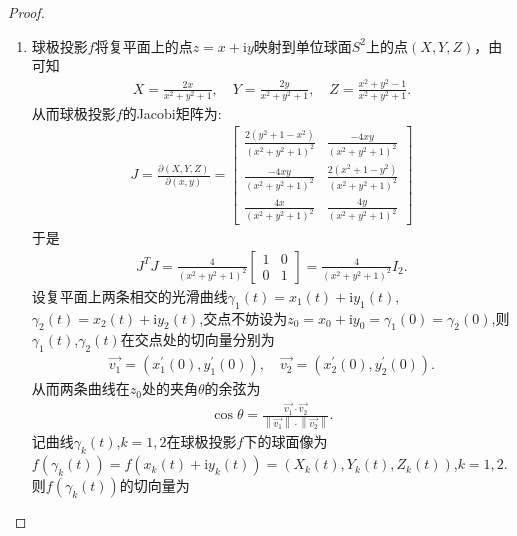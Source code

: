 \documentclass[../../main.tex]{subfiles}%
\begin{document}
\begin{proof}
\begin{enumerate}[(1)]
\item 球极投影$f$将复平面上的点$z = x + \text{i}y$映射到单位球面$S^2$上的点$(X,Y,Z)$，由可知
\begin{align*}
X = \frac{2x}{x^2 + y^2 + 1}, \quad Y = \frac{2y}{x^2 + y^2 + 1}, \quad Z = \frac{x^2 + y^2 - 1}{x^2 + y^2 + 1}.
\end{align*}
从而球极投影$f$的Jacobi矩阵为:
\begin{align*}
J = \frac{\partial(X,Y,Z)}{\partial(x,y)} = \begin{bmatrix}
\frac{2(y^2 + 1 - x^2)}{(x^2 + y^2 + 1)^2} & \frac{-4xy}{(x^2 + y^2 + 1)^2} \\
\frac{-4xy}{(x^2 + y^2 + 1)^2} & \frac{2(x^2 + 1 - y^2)}{(x^2 + y^2 + 1)^2} \\
\frac{4x}{(x^2 + y^2 + 1)^2} & \frac{4y}{(x^2 + y^2 + 1)^2}
\end{bmatrix}
\end{align*}
于是
\begin{align}\label{eq::--2hr89289hjoawjdijwofjo8ewuohj38wjfnv}
J^T J = \frac{4}{(x^2 + y^2 + 1)^2} \begin{bmatrix} 1 & 0 \\ 0 & 1 \end{bmatrix}=\frac{4}{(x^2 + y^2 + 1)^2}I_2.
\end{align}
设复平面上两条相交的光滑曲线$\gamma _1\left( t \right) =x_1\left( t \right) +\mathrm{i}y_1\left( t \right)$,$\gamma _2\left( t \right) =x_2\left( t \right) +\mathrm{i}y_2\left( t \right)$,交点不妨设为$z_0=x_0+\mathrm{i}y_0=\gamma _1\left( 0 \right) =\gamma _2\left( 0 \right)$,则$\gamma _1\left( t \right)$,$\gamma _2\left( t \right)$在交点处的切向量分别为
\begin{align*}
\overrightarrow{v_1}=\left( x_{1}^{\prime}\left( 0 \right) ,y_{1}^{\prime}\left( 0 \right) \right) ,\quad \overrightarrow{v_2}=\left( x_{2}^{\prime}\left( 0 \right) ,y_{2}^{\prime}\left( 0 \right) \right) .
\end{align*}
从而两条曲线在$z_0$处的夹角$\theta$的余弦为
\begin{align*}
\cos \theta =\frac{\overrightarrow{v_1}\cdot \overrightarrow{v_2}}{\left\| \overrightarrow{v_1} \right\| \cdot \left\| \overrightarrow{v_2} \right\|}.
\end{align*}
记曲线$\gamma _k\left( t \right)$,$k=1,2$在球极投影$f$下的球面像为$f\left( \gamma _k\left( t \right) \right) =f\left( x_k\left( t \right) +\mathrm{i}y_k\left( t \right) \right) =\left( X_k\left( t \right) ,Y_k\left( t \right) ,Z_k\left( t \right) \right)$,$k=1,2$.则$f\left( \gamma _k\left( t \right) \right)$的切向量为

\end{enumerate}
\end{proof}
\end{document}
